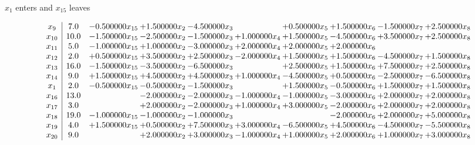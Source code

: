 \documentclass[10pt]{article}
\begin{document}
 $ x_{1} $ enters and $ x_{15} $ leaves 

 \[\begin{array}{c| c c@{\hskip 2pt} c@{\hskip 2pt} c@{\hskip 2pt} c@{\hskip 2pt} c@{\hskip 2pt} c@{\hskip 2pt} c@{\hskip 2pt} c@{\hskip 2pt} }
 x_{9}   &  7.0 & -0.500000 x_{15} & + 1.500000 x_{2} & -4.500000 x_{3} &   & + 0.500000 x_{5} & + 1.500000 x_{6} & -1.500000 x_{7} & + 2.500000 x_{8}\\
 x_{10}   &  10.0 & -1.500000 x_{15} & -2.500000 x_{2} & -1.500000 x_{3} & + 1.000000 x_{4} & + 1.500000 x_{5} & -4.500000 x_{6} & + 3.500000 x_{7} & + 2.500000 x_{8}\\
 x_{11}   &  5.0 & -1.000000 x_{15} & + 1.000000 x_{2} & -3.000000 x_{3} & + 2.000000 x_{4} & + 2.000000 x_{5} & + 2.000000 x_{6} &    &   \\
 x_{12}   &  2.0 & + 0.500000 x_{15} & + 3.500000 x_{2} & + 2.500000 x_{3} & -2.000000 x_{4} & + 1.500000 x_{5} & + 1.500000 x_{6} & -4.500000 x_{7} & + 1.500000 x_{8}\\
 x_{13}   &  16.0 & -1.500000 x_{15} & -3.500000 x_{2} & -6.500000 x_{3} &   & + 2.500000 x_{5} & + 1.500000 x_{6} & + 7.500000 x_{7} & + 2.500000 x_{8}\\
 x_{14}   &  9.0 & + 1.500000 x_{15} & + 4.500000 x_{2} & + 4.500000 x_{3} & + 1.000000 x_{4} & -4.500000 x_{5} & + 0.500000 x_{6} & -2.500000 x_{7} & -6.500000 x_{8}\\
 x_{1}   &  2.0 & -0.500000 x_{15} & -0.500000 x_{2} & -1.500000 x_{3} &   & + 1.500000 x_{5} & -0.500000 x_{6} & + 1.500000 x_{7} & + 1.500000 x_{8}\\
 x_{16}   &  13.0  &   & -2.000000 x_{2} & -2.000000 x_{3} & -1.000000 x_{4} & -1.000000 x_{5} & -3.000000 x_{6} & + 2.000000 x_{7} & + 2.000000 x_{8}\\
 x_{17}   &  3.0  &   & + 2.000000 x_{2} & -2.000000 x_{3} & + 1.000000 x_{4} & + 3.000000 x_{5} & -2.000000 x_{6} & + 2.000000 x_{7} & + 2.000000 x_{8}\\
 x_{18}   &  19.0 & -1.000000 x_{15} & -1.000000 x_{2} & -1.000000 x_{3} &    &   & -2.000000 x_{6} & + 2.000000 x_{7} & + 5.000000 x_{8}\\
 x_{19}   &  4.0 & + 1.500000 x_{15} & + 0.500000 x_{2} & + 7.500000 x_{3} & + 3.000000 x_{4} & -6.500000 x_{5} & + 4.500000 x_{6} & -4.500000 x_{7} & -5.500000 x_{8}\\
 x_{20}   &  9.0  &   & + 2.000000 x_{2} & + 3.000000 x_{3} & -1.000000 x_{4} & + 1.000000 x_{5} & + 2.000000 x_{6} & + 1.000000 x_{7} & + 3.000000 x_{8}\\

\end{array}\]
\end{document}
